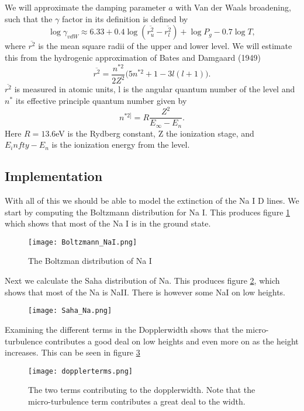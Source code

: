\documentclass{aa}   %
\begin{document}
We will approximate the damping parameter $a$ with Van der Waals broadening, such that the $\gamma$ factor in its definition is defined by
\begin{equation}
 \log \gamma_{vdW} \approx 6.33 + 0.4\log(\overline{r_u^2}-\overline{r_l^2}) +\log P_g -0.7\log T,
\end{equation}
where $\overline{r^2}$ is the mean square radii of the upper and lower level. We will estimate this from the hydrogenic approximation of Bates and Damgaard (1949)
\begin{equation}
 \overline{r^2} =\frac{n^{*2}}{2Z^2}\bigg(5n^{*2} + 1 - 3l(l+1)\bigg).
\end{equation}
$\overline{r^2}$ is measured in atomic units, l is the angular quantum number of the level and $n^*$ its effective principle quantum number given by
\begin{equation}
 n^{*2]} = R\frac{Z^2}{E_\infty - E_n}.
\end{equation}
Here $R = 13.6$eV is the Rydberg constant, Z the ionization stage, and $E_infty - E_n$ is the ionization energy from the level. 

\subsection{Implementation}
With all of this we should be able to model the extinction of the Na I D lines.
We start by computing the Boltzmann distribution for Na I. This produces figure \ref{Boltzmann_NaI} which shows that most of the Na I is in the ground state.

\begin{figure}
 \texttt{[image: Boltzmann\_NaI.png]}
 \caption{The Boltzman distribution of Na I }
\label{Boltzmann_NaI}
\end{figure}

Next we calculate the Saha distribution of Na. This produces figure \ref{Saha_Na}, which shows that most of the Na is NaII. There is however some NaI on low heights.
\begin{figure}
 \texttt{[image: Saha\_Na.png]}
 \caption{}
\label{Saha_Na}
\end{figure}

Examining the different terms in the Dopplerwidth shows that the micro-turbulence contributes a good deal on low heights and even more on as the height increases. This can be seen in figure \ref{dopplerterms}
\begin{figure}
 \texttt{[image: dopplerterms.png]}
 \caption{The two terms contributing to the dopplerwidth. Note that the micro-turbulence term contributes a great deal to the width.}
\label{dopplerterms}
\end{figure}
\end{document}
